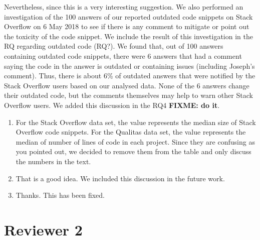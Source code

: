 \documentclass[a4paper,twoside,10pt]{reviewresponse}
\newcommand\FIXME[1]{{\color{red}\textbf{FIXME: #1}}}
\begin{document}
Nevertheless, since this is a very interesting suggestion. We also performed an investigation of the 100 answers of our reported outdated code snippets on Stack Overflow on 6 May 2018 to see if there is any comment to mitigate or point out the toxicity of the code snippet. We include the result of this investigation in the RQ regarding outdated code (RQ?). We found that, out of 100 answers containing outdated code snippets, there were 6 answers that had a comment saying the code in the answer is outdated or containing issues (including Joseph's comment). Thus, there is about 6\% of outdated answers that were notified by the Stack Overflow users based on our analysed data. None of the 6 answers change their outdated code, but the comments themselves may help to warn other Stack Overflow users. We added this discussion in the RQ4 \FIXME{do it}.


\begin{enumerate}
	\item For the Stack Overflow data set, the value represents the median size of Stack Overflow code snippets. For the Qualitas data set, the value represents the median of number of lines of code in each project. Since they are confusing as you pointed out, we decided to remove them from the table and only discuss the numbers in the text.
	\item That is a good idea. We included this discussion in the future work.
	\item Thanks. This has been fixed.
\end{enumerate}

\section{Reviewer 2}

\end{document}
